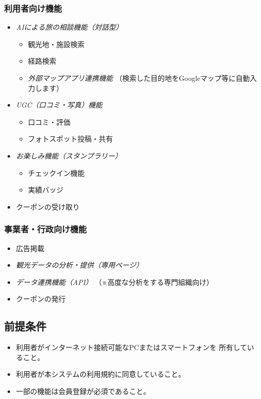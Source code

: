 \documentclass{docs}
\begin{document}
\subsubsection{利用者向け機能}
\begin{itemize}
	\item \emph{AIによる旅の相談機能（対話型）}
	\begin{itemize}
		\item 観光地・施設検索
		\item 経路検索
		\item \emph{外部マップアプリ連携機能}
		（検索した目的地をGoogleマップ等に自動入力します）
	\end{itemize}
	\item \emph{UGC（口コミ・写真）機能}
	\begin{itemize}
		\item 口コミ・評価
		\item フォトスポット投稿・共有
	\end{itemize}
	\item \emph{お楽しみ機能（スタンプラリー）}
	\begin{itemize}
		\item チェックイン機能
		\item 実績バッジ
	\end{itemize}
	\item クーポンの受け取り
\end{itemize}

\subsubsection{事業者・行政向け機能}
\begin{itemize}
	\item 広告掲載
	\item \emph{観光データの分析・提供（専用ページ）}
	\item \emph{データ連携機能（API）}
	（※高度な分析をする専門組織向け）
	\item クーポンの発行
\end{itemize}

\subsection{前提条件}
\begin{itemize}
	\item 利用者がインターネット接続可能なPCまたはスマートフォンを
	所有していること。
	\item 利用者が本システムの利用規約に同意していること。
	\item 一部の機能は会員登録が必須であること。
\end{itemize}
\end{document}
